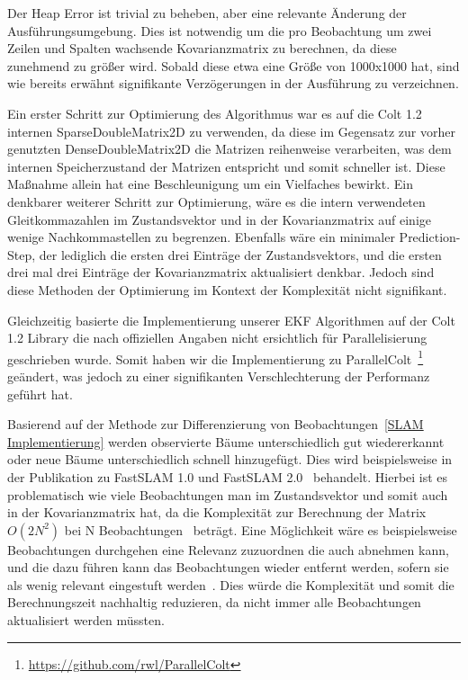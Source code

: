 \documentclass[11pt]{scrartcl}
\begin{document}
{Der Heap Error ist trivial zu beheben, aber eine relevante Änderung der Ausführungsumgebung. Dies ist notwendig um die pro Beobachtung um zwei Zeilen und Spalten wachsende Kovarianzmatrix zu berechnen, da diese zunehmend zu größer wird. Sobald diese etwa eine Größe von 1000x1000 hat, sind wie bereits erwähnt signifikante Verzögerungen in der Ausführung zu verzeichnen.

Ein erster Schritt zur Optimierung des Algorithmus war es auf die Colt 1.2 internen SparseDoubleMatrix2D zu verwenden, da diese im Gegensatz zur vorher genutzten DenseDoubleMatrix2D die Matrizen reihenweise verarbeiten, was dem internen Speicherzustand  der Matrizen entspricht und somit schneller ist. Diese Maßnahme allein hat eine Beschleunigung um ein Vielfaches bewirkt. Ein denkbarer weiterer Schritt zur Optimierung, wäre es die intern verwendeten Gleitkommazahlen im Zustandsvektor und in der Kovarianzmatrix auf einige wenige Nachkommastellen zu begrenzen. Ebenfalls wäre ein minimaler Prediction-Step, der lediglich die ersten drei Einträge der Zustandsvektors, und die ersten drei mal drei Einträge der Kovarianzmatrix aktualisiert denkbar. Jedoch sind diese Methoden der Optimierung im Kontext der Komplexität nicht signifikant.

Gleichzeitig basierte die Implementierung unserer EKF Algorithmen auf der Colt 1.2 Library die nach offiziellen Angaben nicht ersichtlich für Parallelisierung geschrieben wurde. Somit haben wir die Implementierung zu ParallelColt~\footnote{\url{https://github.com/rwl/ParallelColt}} geändert, was jedoch zu einer signifikanten Verschlechterung der Performanz geführt hat.

Basierend auf der Methode zur Differenzierung von Beobachtungen~\ref{SLAM Implementierung} werden observierte Bäume unterschiedlich gut wiedererkannt oder neue Bäume unterschiedlich schnell hinzugefügt. Dies wird beispielsweise in der Publikation zu FastSLAM 1.0 und FastSLAM 2.0~\cite{thrun_fastslam_nodate} behandelt. Hierbei ist es problematisch wie viele Beobachtungen man im Zustandsvektor und somit auch in der Kovarianzmatrix hat, da die Komplexität zur Berechnung der Matrix $O(2N^2)$ bei N Beobachtungen~\cite{ute_SLAM} beträgt. Eine Möglichkeit wäre es beispielsweise Beobachtungen durchgehen eine Relevanz zuzuordnen die auch abnehmen kann, und die dazu führen kann das Beobachtungen wieder entfernt werden, sofern sie als wenig relevant eingestuft werden~\cite{thrun_fastslam_nodate}. Dies würde die Komplexität und somit die Berechnungszeit nachhaltig reduzieren, da nicht immer alle Beobachtungen aktualisiert werden müssten.

}
\end{document}
